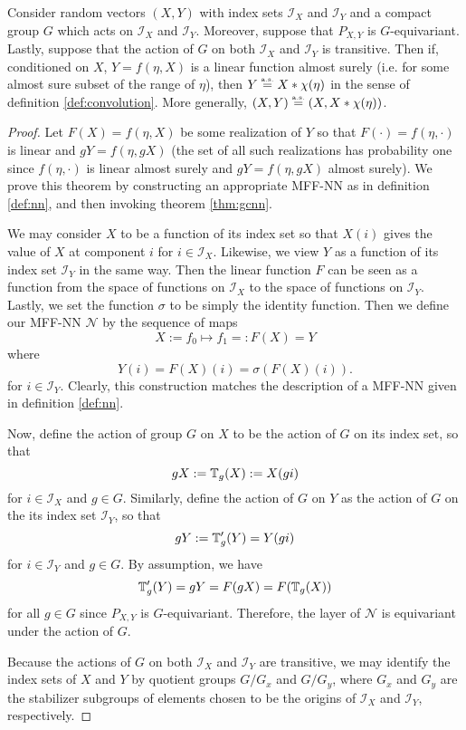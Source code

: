 \documentclass[10pt]{article}
\begin{document}
\begin{theorem}
	Consider random vectors $(X,Y)$ with index sets $\mathcal{I}_X$ and $\mathcal{I}_Y$ and a compact group $G$ which acts on $\mathcal{I}_X$ and $\mathcal{I}_Y$.
	Moreover, suppose that $P_{X,Y}$ is $G$-equivariant.
	Lastly, suppose that the action of $G$ on both $\mathcal{I}_X$ and $\mathcal{I}_Y$ is transitive.
	Then if, conditioned on $X$, $Y = f(\eta, X)$ is a linear function almost surely (i.e. for some almost sure subset of the range of $\eta$), then $Y \stackrel{\text{\rm\tiny a.s.}}{=} X * \chi(\eta)$ in the sense of definition \ref{def:convolution}.
	More generally, $(X,Y) \stackrel{\text{\rm\tiny a.s.}}{=} (X,X * \chi(\eta))$.
\end{theorem}
\begin{proof}
Let $F(X) = f(\eta, X)$ be some realization of $Y$ so that $F(\cdot) = f(\eta, \cdot)$ is linear and $gY = f(\eta,gX)$ (the set of all such realizations has probability one since $f(\eta, \cdot)$ is linear almost surely and $gY = f(\eta,gX)$ almost surely).
We prove this theorem by constructing an appropriate MFF-NN as in definition \ref{def:nn}, and then invoking theorem \ref{thm:gcnn}.

We may consider $X$ to be a function of its index set so that $X(i)$ gives the value of $X$ at component $i$ for $i \in \mathcal{I}_X$.
Likewise, we view $Y$ as a function of its index set $\mathcal{I}_{Y}$ in the same way.
Then the linear function $F$ can be seen as a function from the space of functions on $\mathcal{I}_{X}$ to the space of functions on $\mathcal{I}_Y$.
Lastly, we set the function $\sigma$ to be simply the identity function.
Then we define our MFF-NN $\mathcal{N}$ by the sequence of maps
$$
	X := f_0 \mapsto f_1 =: F(X) = Y
$$
where
$$
	Y(i) = F(X)(i) = \sigma(F(X)(i)).
$$
for $i \in \mathcal{I}_Y$.
Clearly, this construction matches the description of a MFF-NN given in definition \ref{def:nn}.

Now, define the action of group $G$ on $X$ to be the action of $G$ on its index set, so that
$$
	gX := \mathbb{T}_g(X) := X(gi)
$$
for $i \in \mathcal{I}_{X}$ and $g \in G$.
Similarly, define the action of $G$ on $Y$ as the action of $G$ on the its index set $\mathcal{I}_Y$, so that
$$
	gY := \mathbb{T}'_g(Y) = Y(g i)
$$
for $i \in \mathcal{I}_{Y}$ and $g \in G$.
By assumption, we have
$$
	\mathbb{T}'_g(Y) = gY = F(gX) = F(\mathbb{T}_g(X))
$$
for all $g \in G$ since $P_{X,Y}$ is $G$-equivariant.
Therefore, the layer of $\mathcal{N}$ is equivariant under the action of $G$.

Because the actions of $G$ on both $\mathcal{I}_{X}$ and $\mathcal{I}_{Y}$ are transitive, we may identify the index sets of $X$ and $Y$ by quotient groups $G/G_x$ and $G/G_y$, where $G_x$ and $G_y$ are the stabilizer subgroups of elements chosen to be the origins of $\mathcal{I}_X$ and $\mathcal{I}_Y$, respectively.


\end{proof}
\end{document}
